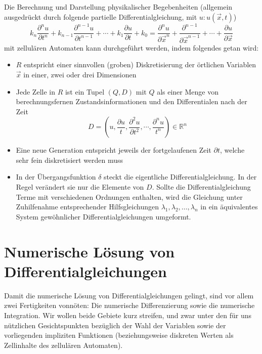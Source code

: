 \documentclass[11pt]{report} %
\theoremstyle{definition}
\begin{document}
Die Berechnung und Darstellung physikalischer Begebenheiten (allgemein ausgedrückt durch folgende partielle Differentialgleichung, mit $u: u(\vec{x}, t)$)
\begin{equation*}
k_n \frac{\partial^n u}{\partial t^n} + k_{n-1} \frac{\partial^{n-1} u}{\partial t^{n-1}} + \cdots + k_1 \frac{\partial u}{\partial t} + k_0 = \frac{\partial^n u}{\partial  \vec{x}^n} + \frac{\partial^{n-1}}{\partial \vec{x}^{n-1}} + \cdots + \frac{\partial u}{\partial \vec{x}}
\end{equation*}
mit zellulären Automaten kann durchgeführt werden, indem folgendes getan wird:
\begin{itemize}
\item $R$ entspricht einer sinnvollen (groben) Diskretisierung der örtlichen Variablen $\vec{x}$ in einer, zwei oder drei Dimensionen
\item Jede Zelle in $R$ ist ein Tupel $(Q, D)$ mit $Q$ als einer Menge von berechnungsfernen Zustandsinformationen und den Differentialen nach der Zeit
\[
D = \left( u, \frac{\partial u}{t}, \frac{\partial^2 u}{\partial t^2}, \cdots, \frac{\partial^n u}{t^n} \right)  \in \mathbb{R}^n
\]
\item Eine neue Generation entspricht jeweils der fortgelaufenen Zeit $\partial t$, welche sehr fein diskretisiert werden muss
\item In der Übergangsfunktion $\delta$ steckt die eigentliche Differentialgleichung. In der Regel verändert sie nur die Elemente von $D$. Sollte die Differentialgleichung Terme mit verschiedenen Ordnungen enthalten, wird die Gleichung unter Zuhilfenahme entsprechender Hilfsgleichungen $\lambda_1, \lambda_2, \dots, \lambda_n$ in ein äquivalentes System gewöhnlicher Differentialgleichungen umgeformt. 
\end{itemize}

\section{Numerische Lösung von Differentialgleichungen}

Damit die numerische Lösung von Differentialgleichungen gelingt, sind vor allem zwei Fertigkeiten vonnöten: Die numerische Differenzierung sowie die numerische Integration. Wir wollen beide Gebiete kurz streifen, und zwar unter den für uns nützlichen Gesichtspunkten bezüglich der Wahl der Variablen sowie der vorliegenden impliziten Funktionen (beziehungsweise diskreten Werten als Zellinhalte des zellulären Automaten).
\end{document}
